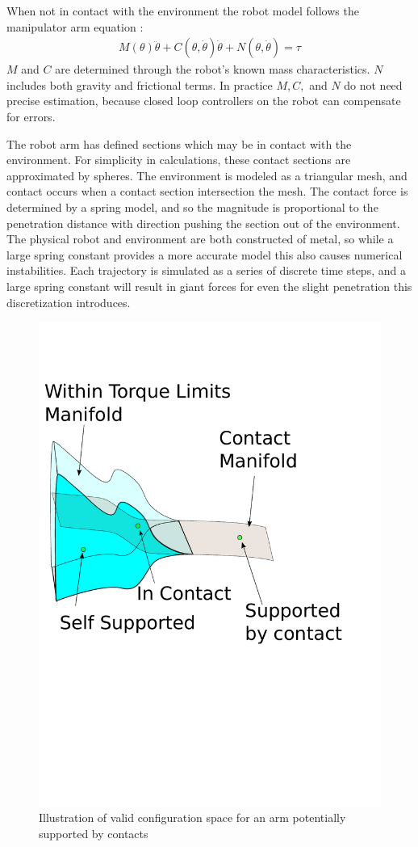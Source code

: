 \documentclass[../thesis.tex]{subfiles}
\begin{document}
When not in contact with the environment the robot model follows the manipulator arm equation \cite{murray1994mathematical}:
\begin{align}
  M(\theta)\ddot \theta + C(\theta, \dot\theta)\dot\theta + N(\theta, \dot\theta) = \tau
\end{align}
$M$ and $C$ are determined through the robot's known mass characteristics.
$N$ includes both gravity and frictional terms.
In practice $M, C,$ and $N$ do not need precise estimation, because closed loop controllers on the robot can compensate for errors.

The robot arm has defined sections which may be in contact with the environment.
For simplicity in calculations, these contact sections are approximated by spheres.
The environment is modeled as a triangular mesh, and contact occurs when a contact section intersection the mesh.
The contact force is determined by a spring model, and so the magnitude is proportional to the penetration distance with direction pushing the section out of the environment.
The physical robot and environment are both constructed of metal, so while a large spring constant provides a more accurate model this also causes numerical instabilities.
Each trajectory is simulated as a series of discrete time steps, and a large spring constant will result in giant forces for even the slight penetration this discretization introduces.




\begin{figure}
  \centering
  \includegraphics[width=.5\linewidth]{./Planning/thin_manifold.pdf}
  
  \caption{Illustration of valid configuration space for an arm potentially supported by contacts}
  \label{fig:ThinManifold}
\end{figure}
\end{document}

